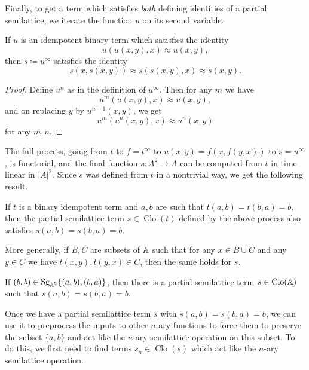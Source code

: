 \documentclass[letterpaper,11pt]{article}
\DeclareMathOperator{\Clo}{Clo}
\DeclareMathOperator{\Sg}{Sg}
\begin{document}
Finally, to get a term which satisfies \emph{both} defining identities of a partial semilattice, we iterate the function $u$ on its second variable.

\begin{prop} If $u$ is an idempotent binary term which satisfies the identity
\[
u(u(x,y),x) \approx u(x,y),
\]
then $s \coloneqq u^\infty$ satisfies the identity
\[
s(x,s(x,y)) \approx s(s(x,y),x) \approx s(x,y).
\]
\end{prop}
\begin{proof} Define $u^n$ as in the definition of $u^\infty$. Then for any $m$ we have
\[
u^m(u(x,y),x) \approx u(x,y),
\]
and on replacing $y$ by $u^{n-1}(x,y)$, we get
\[
u^m(u^n(x,y),x) \approx u^n(x,y)
\]
for any $m,n$.
\end{proof}

The full process, going from $t$ to $f = t^\infty$ to $u(x,y) = f(x,f(y,x))$ to $s = u^\infty$, is functorial, and the final function $s : A^2 \rightarrow A$ can be computed from $t$ in time linear in $|A|^2$. Since $s$ was defined from $t$ in a nontrivial way, we get the following result.

\begin{prop} If $t$ is a binary idempotent term and $a,b$ are such that $t(a,b) = t(b,a) = b$, then the partial semilattice term $s \in \Clo(t)$ defined by the above process also satisfies $s(a,b) = s(b,a) = b$.

More generally, if $B,C$ are subsets of $\mathbb{A}$ such that for any $x \in B\cup C$ and any $y \in C$ we have $t(x,y), t(y,x) \in C$, then the same holds for $s$.
\end{prop}

\begin{cor} If $(b,b) \in \Sg_{\bA^2}\{(a,b), (b,a)\}$, then there is a partial semilattice term $s \in \Clo(\bA)$ such that $s(a,b) = s(b,a) = b$.
\end{cor}

Once we have a partial semilattice term $s$ with $s(a,b) = s(b,a) = b$, we can use it to preprocess the inputs to other $n$-ary functions to force them to preserve the subset $\{a,b\}$ and act like the $n$-ary semilattice operation on this subset. To do this, we first need to find terms $s_n \in \Clo(s)$ which act like the $n$-ary semilattice operation.
\end{document}
